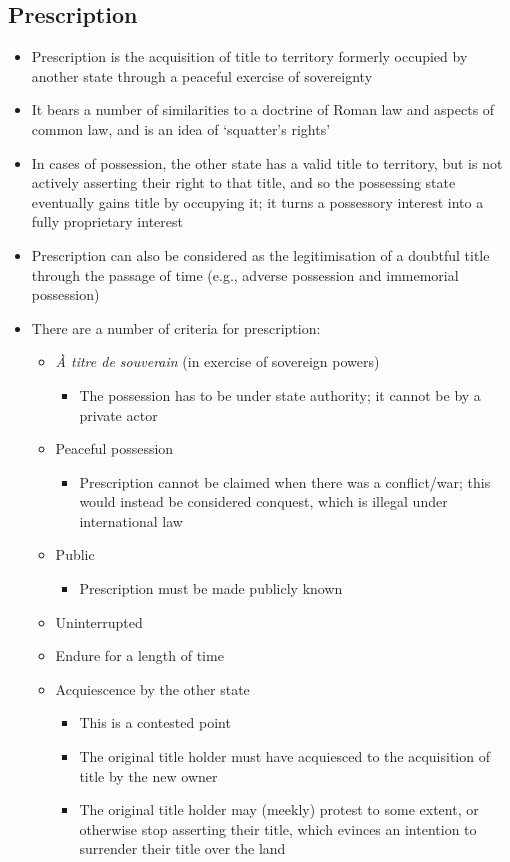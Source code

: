 \subsection{Prescription}
\begin{itemize}
    \item Prescription is the acquisition of title to territory formerly occupied by another state through a peaceful exercise of sovereignty
    \item It bears a number of similarities to a doctrine of Roman law and aspects of common law, and is an idea of `squatter's rights'
    \item In cases of possession, the other state has a valid title to territory, but is not actively asserting their right to that title, and so the possessing state eventually gains title by occupying it; it turns a possessory interest into a fully proprietary interest
    \item Prescription can also be considered as the legitimisation of a doubtful title through the passage of time (e.g., adverse possession and immemorial possession)
    \item There are a number of criteria for prescription:
    \begin{itemize}
        \item \textit{À titre de souverain} (in exercise of sovereign powers)
        \begin{itemize}
            \item The possession has to be under state authority; it cannot be by a private actor
        \end{itemize}
        \item Peaceful possession
        \begin{itemize}
            \item Prescription cannot be claimed when there was a conflict/war; this would instead be considered conquest, which is illegal under international law
        \end{itemize}
        \item Public
        \begin{itemize}
            \item Prescription must be made publicly known
        \end{itemize}
        \item Uninterrupted
        \item Endure for a length of time
        \item Acquiescence by the other state
        \begin{itemize}
            \item This is a contested point
            \item The original title holder must have acquiesced to the acquisition of title by the new owner
            \item The original title holder may (meekly) protest to some extent, or otherwise stop asserting their title, which evinces an intention to surrender their title over the land
        \end{itemize}
    \end{itemize}
\end{itemize}

